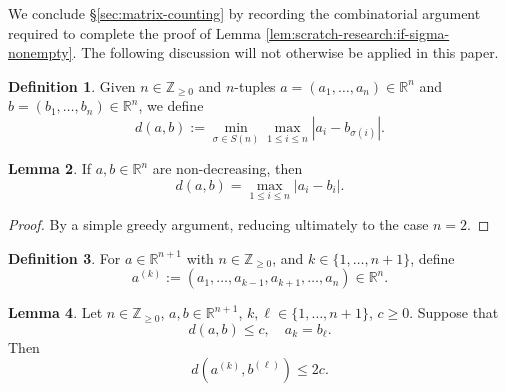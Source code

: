 \documentclass[reqno]{amsart}
\theoremstyle{plain} \newtheorem{theorem} {Theorem}
\theoremstyle{definition} \newtheorem{definition} [theorem] {Definition}
\theoremstyle{itplain} %
\newtheorem{lemma}[theorem]{Lemma}
\numberwithin{equation}{section}
\numberwithin{theorem}{section}
\renewcommand{\geq}{\geqslant}
\renewcommand{\leq}{\leqslant}
\begin{document}
We conclude \S\ref{sec:matrix-counting} by recording the combinatorial argument required to complete the proof of Lemma \ref{lem:scratch-research:if-sigma-nonempty}.  The following discussion will not otherwise be applied in this paper.
\begin{definition}
Given $n \in \mathbb{Z}_{\geq 0}$ and $n$-tuples $a = (a_1,\dotsc,a_n) \in \mathbb{R}^n$ and $b = (b_1,\dotsc,b_n)\in \mathbb{R}^n$, we define
\begin{equation*}
  d(a,b) := \min_{\sigma \in S(n)}
  \max_{1 \leq i \leq n}
  |a_i - b_{\sigma(i)}|.
\end{equation*}
\end{definition}
\begin{lemma}\label{lem:manhattan-greedy}
  If $a,b \in \mathbb{R}^n$ are non-decreasing, then
  \begin{equation*}
    d(a,b) = \max_{1 \leq i \leq n} |a_i - b_i|.
  \end{equation*}
\end{lemma}
\begin{proof}
  By a simple greedy argument, reducing ultimately to the case $n = 2$.
\end{proof}
\begin{definition}
For $a \in \mathbb{R}^{n+1}$ with $n \in \mathbb{Z}_{\geq 0}$, and $k \in \{1,\dotsc, n+1\}$, define
\begin{equation*}
  a^{(k)} := (a_1,\dotsc,a_{k-1},a_{k+1},\dotsc,a_{n}) \in \mathbb{R}^{n}.
\end{equation*}
\end{definition}
\begin{lemma}\label{lem:scratch-research:let-n-geq}
  Let $n \in \mathbb{Z}_{\geq 0}$, $a,b \in \mathbb{R}^{n+1}$, $k,\ell \in \{1,\dotsc,n+1\}$, $c \geq 0$.  Suppose that
  \begin{equation*}
    d (a,b) \leq c, \quad
    a_k = b_{\ell}.
  \end{equation*}
  Then
  \begin{equation*}
    d (a^{(k)}, b^{(\ell)}) \leq 2 c.
  \end{equation*}
\end{lemma}
\end{document}
